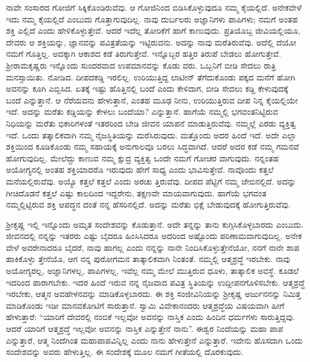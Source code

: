 ನಾವೇ ಸಂಸಾರದ ಗೋಜಿಗೆ ಸಿಕ್ಕಿಕೊಂಡಿರುವೆವು. ಆ ಗೋಜಿನಿಂದ ಬಿಡಿಸಿಕೊಳ್ಳುವುದೂ ನಮ್ಮ ಕೈಯಲ್ಲಿದೆ. ಅನೇಕವೇಳೆ ಇದು ನಮ್ಮ ಕೈಯಲ್ಲಿದೆ ಎಂಬುದು ಗೊತ್ತಾಗುವುದಿಲ್ಲ. ನಾವು ದುರ್ಬಲರು ಅಜ್ಞಾನಿಗಳು ಪಾಪಿಗಳು; ನಮಗೆ ಅಂತಹ ಶಕ್ತಿ ಎಲ್ಲಿದೆ ಎಂದು ಹೇಳಿಕೊಳ್ಳುತ್ತೇವೆ. ಆದರೆ ಇದೆಲ್ಲ ತೋರಿಕೆಗೆ ಹಾಗೆ ಕಾಣುವುದು. ಪ್ರತಿಯೊಬ್ಬ ಜೀವಿಯಲ್ಲಿಯೂ, ದೇವರು ಆ ಶಕ್ತಿಯನ್ನು, ಜ್ಞಾನವನ್ನು ಪವಿತ್ರತೆಯನ್ನು ಇಟ್ಟಿರುವನು. ಅದನ್ನು ನಾವು ಮರೆತಿರುವೆವು. ಅದೆಲ್ಲಿ ದೆಯೋ ನಮಗೆ ಗೊತ್ತಿಲ್ಲ. ಅದಕ್ಕಾಗಿ ಆಕಾಶದ ಕಡೆ ತಿರುಗುತ್ತೇವೆ. ಇನ್ನೊಬ್ಬರ ಹತ್ತಿರ ತಿರುಪೆ ಬೇಡಲು ಹೋಗುತ್ತೇವೆ. ಶ್ರೀರಾಮಕೃಷ್ಣರು ಇನ್ನೊಂದು ಸುಂದರವಾದ ಉಪಮಾನವನ್ನು ಕೊಡು ವರು. ಒಬ್ಬನಿಗೆ ಬೀಡಿ ಸೇದಲು ರಾತ್ರಿ ಮನಸ್ಸಾಯಿತು. ನೋಡಿದ. ದೀಪದಕಡ್ಡಿ ಇರಲಿಲ್ಲ. ಉರಿಯುತ್ತಿದ್ದ ಲಾಟೀನ್ ತೆಗೆದುಕೊಂಡು ಪಕ್ಕದ ಮನೆಗೆ ಹೋಗಿ ಅವನನ್ನು ಕೂಗಿ ಎಬ್ಬಿಸಿದ. ಏತಕ್ಕೆ ಇಷ್ಟು ಹೊತ್ತಿನಲ್ಲಿ ಬಂದೆ ಎಂದು ಕೇಳಿದಾಗ, ಬೀಡಿ ಸೇದಲು ಕಡ್ಡಿ ಕೇಳುವುದಕ್ಕೆ ಬಂದೆ ಎನ್ನುತ್ತಾನೆ. ಆ ನೆರೆಯವನು ಹೇಳುತ್ತಾನೆ, ಎಂತಹ ಮೂಢ ನೀನು, ಉರಿಯುತ್ತಿರುವ ದೀಪ ನಿನ್ನ ಕೈಯಲ್ಲಿಯೇ ಇದೆ. ಅದನ್ನು ಮರೆತು ಕಡ್ಡಿಯನ್ನು ಕೇಳಲು ಬಂದೆಯಾ? ಎನ್ನುತ್ತಾನೆ. ಹಾಗೆಯೆ ನಮ್ಮಲ್ಲಿ ಭಗವಂತನಿಟ್ಟಿರುವ ನಿಧಿಯನ್ನು ಮರೆತು ಭಿಕಾರಿಗಳಂತೆ ಇತರರಿಂದ ಬೇಡಿ ಜೀವನ ಯಾಪನೆ ಮಾಡುತ್ತಿರುವೆವು. ನಮ್ಮಲ್ಲೆ ಎರಡು ವ್ಯಕ್ತಿತ್ವ ಇದೆ. ಒಂದು ತತ್ಕಾಲಿಕವಾಗಿ ನಮ್ಮ ನೈಜಸ್ಥಿತಿಯನ್ನು ಮರೆಸಿರುವುದು. ಮತ್ತೊಂದು ಅದರ ಹಿಂದೆ ಇದೆ. ಅದೇ ಎಲ್ಲಾ ಶಕ್ತಿಯಿಂದ ಕೂಡಿಕೊಂಡು ನಮ್ಮ ಸಹಾಯಕ್ಕೆ ಅನುಗಾಲವೂ ಬರಲು ಸಿದ್ಧವಾಗಿದೆ. ಆದರೆ ಅದರ ಕಡೆ ನಮ್ಮ ಗಮನವೆ ಹೋಗುವುದಿಲ್ಲ. ಮೇಲೆದ್ದು ಕಾಣುವ ನಮ್ಮ ಕ್ಷುದ್ರ ವ್ಯಕ್ತಿತ್ವ ಒಂದೇ ನಮಗೆ ಗೋಚರ ವಾಗುವುದು. ನನ್ನಂತಹ ಅಯೋಗ್ಯನಲ್ಲಿ ಅಂತಹ ಶಕ್ತಿಯಾದರೊ ಇರುವುದು ಹೇಗೆ ಸಾಧ್ಯ ಎಂದು ಭಾವಿಸುತ್ತೇವೆ. ನಾವೊಂದು ಕತ್ತಲೆ ಮನೆಯಲ್ಲಿರುವೆವು. ಅಯ್ಯೊ ಕತ್ತಲೆ ಕತ್ತಲೆ ಎಂದು ಅರಚು ತ್ತಿರುವೆವು. ದೀಪದ ಪೆಟ್ಟಿಗೆ ನಮ್ಮ ಜೇಬಿನಲ್ಲಿದೆ. ಅದನ್ನು ಗೀಚಿದೊಡನೆ ಕತ್ತಲೆ ಎಷ್ಟು ಕಾಲದಿಂದ ಇದ್ದರೇನು, ತಕ್ಷಣವೇ ಮಾಯವಾಗುವುದು. ಹಾಗೆಯೆ ಭಗವಂತ ನಮ್ಮಲ್ಲಿಟ್ಟಿರುವ ಶಕ್ತಿ ಆಪದ್ಧನ ದಂತೆ ನನ್ನ ಹೆಸರಿನಲ್ಲಿದೆ. ಅದನ್ನು ಮರೆತು ಭಿಕ್ಷೆ ಬೇಡುವುದಕ್ಕೆ ಹೋಗುತ್ತಿರುವೆವು.

ಶ್ರೀಕೃಷ್ಣ ಇಲ್ಲಿ ಇನ್ನೊಂದು ಅಮೃತ ಸಂದೇಶವನ್ನು ಕೊಡುತ್ತಾನೆ. ಅದೇ ತನ್ನನ್ನು ತಾನು ಕುಗ್ಗಿಸಿಕೊಳ್ಳಬಾರದು ಎಂಬುದು. ಜೀವನದಲ್ಲಿ ನನ್ನನ್ನು ಇತರರು ಎಷ್ಟು ಬೈದರೂ ಹಿಂಸಿಸಿದರೂ ಅದರಿಂದ ಅಷ್ಟೊಂದು ಪರಿಣಾಮವಾಗುವುದಿಲ್ಲ. ಅನೇಕ ವೇಳೆ ಅವರೇನಾದರೂ ಬೈದರೆ, ನಾವು ಹಾಗಲ್ಲ ಎಂದು ನನ್ನನ್ನು ನಾನೇ ನಿಂದಿಸಿಕೊಳ್ಳುತ್ತೇನೆಯೋ, ನನಗೆ ನಾನೇ ಶಾಪ ಹಾಕಿಕೊಳ್ಳು ತ್ತೇನೆಯೊ, ಆಗ ನನ್ನ ಪುರೋಗಮನ ತಾತ್ಕಾಲಿಕವಾಗಿ ನಿಂತಂತೆ. ನಮ್ಮಲ್ಲಿ ಆತ್ಮಶ್ರದ್ಧೆ ಇರಬೇಕು. ನಾವು ಅಯೋಗ್ಯರಲ್ಲ, ಅಜ್ಞಾನಿಗಳಲ್ಲ, ಪಾಪಿಗಳಲ್ಲ, ಇವೆಲ್ಲ ನಮ್ಮ ಮೇಲೆ ಮುತ್ತಿರುವ ಧೂಳು, ತಾತ್ಕಾಲಿಕ ಅವಸ್ಥೆ. ಕೂಡಲೆ ಇದರಿಂದ ಪಾರಾಗಬೇಕು. ಇದರ ಹಿಂದೆ ಇರುವ ನನ್ನ ನೈಜವಾದ ಪವಿತ್ರ ಸ್ಥಿತಿಯನ್ನು ಉದ್ದೀಪನಗೊಳಿಸಬೇಕು. ಆತ್ಮಶ್ರದ್ಧೆ ಇರಬೇಕು, ಆತ್ಮನ ಅವಹೇಳನವನ್ನು ಮಾಡಿಕೊಳ್ಳಬಾರದು. ಈ ಶಕ್ತಿ ಸಂಜೀವಿನಿಯನ್ನು ಶ್ರೀಕೃಷ್ಣ ಅರ್ಜುನನನ್ನು ನಿಮಿತ್ತ ಮಾಡಿಕೊಂಡು ಇಡೀ ಮಾನವಕೋಟಿಗೆ ಸಾರುತ್ತಾನೆ. ಸ್ವಾಮಿ ವಿವೇಕಾನಂದರು ಆತ್ಮಶ್ರದ್ಧೆಯ ವಿಷಯವಾಗಿ ಹೀಗೆ ಹೇಳುತ್ತಾರೆ: “ಯಾರಿಗೆ ದೇವರಲ್ಲಿ ನಂಬಿಕೆ ಇಲ್ಲವೋ ಅವನನ್ನು ನಾಸ್ತಿಕ ಎಂದು ಹಿಂದಿನ ಧರ್ಮಗಳು ಸಾರುತ್ತಿದ್ದವು. ಆದರೆ ಯಾರಿಗೆ ಆತ್ಮಶ್ರದ್ಧೆ ಇಲ್ಲವೋ ಅವನನ್ನು ನಾಸ್ತಿಕ ಎನ್ನುತ್ತೇನೆ ನಾನು”. ಈಶ್ವರ ನಿಂದೆಯನ್ನು ಮಹಾ ಪಾಪ ಎನ್ನುತ್ತಾರೆ, ಆತ್ಮ ನಿಂದೆಗಿಂತ ಮಹಾಪಾಪವಿನ್ನಿಲ್ಲ ಎಂದು ನಾನು ಹೇಳುತ್ತೇನೆ ಎನ್ನುತ್ತಾರೆ. ಇದೇನು ಹೊಸದಾಗಿ ಒಂದು ಸಂದೇಶವನ್ನು ಅವರು ಹೇಳುತ್ತಿಲ್ಲ. ಈ ಸಂದೇಶಕ್ಕೆ ಮೂಲ ನಮಗೆ ಗೀತೆಯಲ್ಲಿ ದೊರಕುವುದು.

